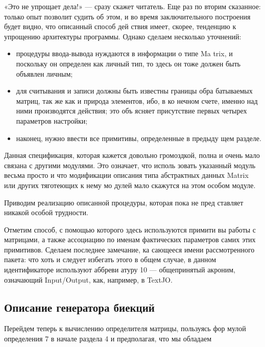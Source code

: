 \documentclass{../../template/mai_book}
\begin{document}
\newpage
«Это не упрощает дела!» — сразу скажет читатель. Еще раз по­
вторим сказанное: только опыт позволит судить об этом, и во время
заключительного построения будет видно, что описанный способ дей­
ствия имеет, скорее, тенденцию к упрощению архитектуры программы.
Однако сделаем несколько уточнений:
\begin{itemize}
\item процедуры ввода-вывода нуждаются в информации о типе Ma­
trix, и поскольку он определен как личный тип, то здесь он тоже
должен быть объявлен личным;
\item для считывания и записи должны быть известны границы обра­
батываемых матриц, так же как и природа элементов, ибо, в ко­
нечном счете, именно над ними производятся действия; это объ­
ясняет присутствие первых четырех параметров настройки;
\item наконец, нужно ввести все примитивы, определенные в предыду­
щем разделе.
\end{itemize}

Данная спецификация, которая кажется довольно громоздкой, полна
и очень мало связана с другими модулями. Это означает, что исполь­
зовать указанный модуль весьма просто и что модификации описания
типа абстрактных данных Matrix или других тяготеющих к нему мо­
дулей мало скажутся на этом особом модуле.

\newpage

Приводим реализацию описанной процедуры, которая пока не пред­
ставляет никакой особой трудности.


Отметим способ, с помощью которого здесь используются примити­
вы работы с матрицами, а также ассоциацию по именам фактических
параметров самих этих примитивов. Сделаем последнее замечание, ка­
сающееся имени рассмотренного пакета: что хоть и следует избегать
этого в общем случае, в данном идентификаторе используют аббреви­
атуру 10 — общепринятый акроним, означающий Input/Output, как,
например, в TextJO.

\subsection{Описание генератора биекций}

Перейдем теперь к вычислению определителя матрицы, пользуясь фор­
мулой определения 7 в начале раздела 4 и предполагая, что мы обладаем

\newpage
\end{document}
